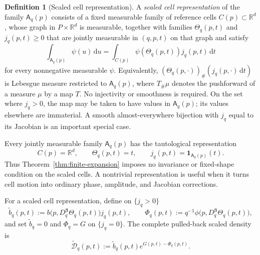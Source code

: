 \documentclass[11pt]{amsart}
\numberwithin{equation}{section}
\theoremstyle{definition}
\newtheorem{definition}[theorem]{Definition}
\theoremstyle{remark}
\newcommand{\R}{\mathbb{R}}
\newcommand{\ind}{\mathbf{1}}
\newcommand{\dd}{\,\mathrm{d}}
\newcommand{\cD}{\mathcal{D}}
\newcommand{\Afib}{\mathsf{A}}
\begin{document}
\begin{definition}[Scaled cell representation]
\label{def:scaled-cell-representation}
A \emph{scaled cell representation} of the family $\Afib_q(p)$ consists of a
fixed measurable family of reference cells $C(p)\subset\R^d$, whose
graph in $P\times\R^d$ is measurable, together with families
$\Theta_q(p,t)$ and $j_q(p,t)\ge0$ that are jointly measurable in $(q,p,t)$
on that graph and satisfy
\begin{equation}\label{eq:finite-cell-change-of-variables}
 \int_{\Afib_q(p)}\psi(u)\dd u
 =\int_{C(p)}\psi(\Theta_q(p,t))j_q(p,t)\dd t
\end{equation}
for every nonnegative measurable $\psi$.  Equivalently,
$(\Theta_q(p,\cdot))_\#(j_q(p,\cdot)\dd t)$ is Lebesgue measure restricted to
$\Afib_q(p)$, where $T_\#\mu$ denotes the pushforward of a measure $\mu$ by a
map $T$.  No injectivity or smoothness is required.  On the set where
$j_q>0$, the map may be taken to have values in $\Afib_q(p)$; its values elsewhere
are immaterial.  A smooth almost-everywhere bijection with $j_q$ equal to its
Jacobian is an important special case.

Every jointly measurable family $\Afib_q(p)$ has the tautological representation
\begin{equation}\label{eq:tautological-cell-representation}
 C(p)=\R^d,\qquad \Theta_q(p,t)=t,\qquad
 j_q(p,t)=\ind_{\Afib_q(p)}(t).
\end{equation}
Thus Theorem~\ref{thm:finite-expansion} imposes no invariance or fixed-shape
condition on the scaled cells.  A nontrivial representation is useful when it
turns cell motion into ordinary phase, amplitude, and Jacobian corrections.
\end{definition}

For a scaled cell representation, define on $\{j_q>0\}$
\begin{equation}\label{eq:transported-amplitude-phase}
 \widetilde b_q(p,t):=b\bigl(p,D_q^{\bm\beta}\Theta_q(p,t)\bigr)j_q(p,t),
 \qquad
 \Phi_q(p,t):=q^{-1}
 \phi\bigl(p,D_q^{\bm\beta}\Theta_q(p,t)\bigr),
\end{equation}
and set $\widetilde b_q=0$ and $\Phi_q=G$ on $\{j_q=0\}$.  The complete pulled-back
scaled density is
\begin{equation}\label{eq:straightened-density}
 \widetilde{\cD}_q(p,t):=\widetilde b_q(p,t)e^{G(p,t)-\Phi_q(p,t)}.
\end{equation}
\end{document}
